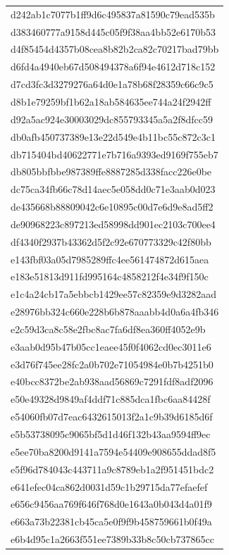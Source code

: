 \begin{tabular}{l}
d242ab1c7077b1ff9d6c495837a81590c79ead535b \\
d383460777a9158d445c05f9f38aa4bb52e6170b53 \\
d4f85454d4357b08cea8b82b2ca82c70217bad79bb \\
d6fd4a4940eb67d508494378a6f94e4612d718c152 \\
d7cd3fc3d3279276a64d0e1a78b68f28359c66c9c5 \\
d8b1e79259bf1b62a18ab584635ee744a24f2942ff \\
d92a5ac924e30003029dc855793345a5a2f8dfcc59 \\
db0afb450737389e13e22d549e4b11bc55c872c3c1 \\
db715404bd40622771e7b716a9393ed9169f755eb7 \\
db805bbfbbe987389ffe8887285d338facc226e0be \\
dc75ca34fb66c78d14aec5e058dd0c71e3aab0d023 \\
de435668b88809042c6e10895c00d7e6d9e8ad5ff2 \\
de90968223c897213ed58998dd901ec2103c700ee4 \\
df4340f2937b43362d5f2c92e670773329c42f80bb \\
e143fbf03a05d7985289ffc4ee561474872d615aea \\
e183e51813d911fd995164c4858212f4e34f9f150c \\
e1c4a24cb17a5ebbcb1429ee57c82359e9d3282aad \\
e28976bb324c660e228b6b878aaabb4d0a6a4fb346 \\
e2c59d3ca8c58e2fbc8ac7fa6df8ea360ff4052e9b \\
e3aab0d95b47b05cc1eaee45f0f4062cd0ec3011e6 \\
e3d76f745ee28fc2a0b702e71054984e0b7b4251b0 \\
e40bcc8372be2ab938aad56869c7291fdf8adf2096 \\
e50e49328d9849af4ddf71c885dca1fbc6aa84428f \\
e54060fb07d7eac6432615013f2a1c9b39d6185d6f \\
e5b53738095c9065bf5d1d46f132b43aa9594ff9ec \\
e5ee70ba8200d9141a7594e54409e908655ddad8f5 \\
e5f96d784043c443711a9c8789eb1a2f951451bdc2 \\
e641efec04ca862d0031d59c1b29715da77efaefef \\
e656c9456aa769f646f768d0e1643a0b043d4a01f9 \\
e663a73b22381cb45ca5e0f9f9b458759661b0f49a \\
e6b4d95c1a2663f551ee7389b33b8c50cb737865cc \\

\end{tabular}
